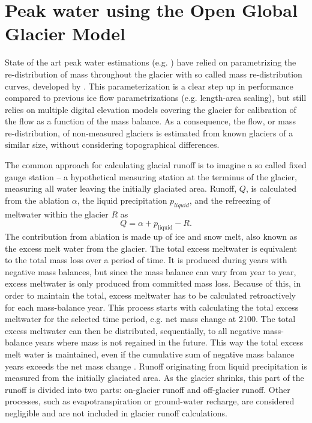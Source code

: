 \documentclass[12pt, a4paper]{article}
\begin{document}
\section{Peak water using the Open Global Glacier Model}
State of the art peak water estimations (e.g.
\cite{rounceGlacierMassChange2020,hussGlobalscaleHydrologicalResponse2018}) have
relied on parametrizing the re-distribution of mass throughout the glacier with
so called mass re-distribution curves, developed by
\textcite{hussFutureHighmountainHydrology2010}. This parameterization is a clear
step up in performance compared to previous ice flow parametrizations (e.g.
length-area scaling), but still relies on multiple digital elevation models
covering the glacier for calibration of the flow as a function of the mass
balance. As a consequence, the flow, or mass re-distribution, of non-measured
glaciers is estimated from known glaciers of a similar size, without
considering topographical differences. 

The common approach for calculating glacial runoff is to imagine a so called
fixed gauge station -- a hypothetical measuring station at the terminus of the
glacier, measuring all water leaving the initially glaciated area. Runoff, $Q$,
is calculated from the ablation $\alpha$, the liquid precipitation $p_{liquid}$,
and the refreezing of meltwater within the glacier $R$ as
\begin{equation}
    Q = \alpha + p_{\mathrm{liquid}} - R.
\end{equation}
The contribution from ablation is made up of ice and snow melt, also known as
the excess melt water from the glacier. The total excess meltwater is equivalent
to the total mass loss over a period of time. It is produced during years with
negative mass balances, but since the mass balance can vary from year to year,
excess meltwater is only produced from committed mass loss. Because of this, in
order to maintain the total, excess meltwater has to be calculated retroactively
for each mass-balance year. This process starts with calculating the total
excess meltwater for the selected time period, e.g. net mass change at 2100. The
total excess meltwater can then be distributed, sequentially, to all negative
mass-balance years where mass is not regained in the future. This way the total
excess melt water is maintained, even if the cumulative sum of negative mass
balance years exceeds the net mass change
\parencite{rounceGlacierMassChange2020}. Runoff originating from liquid
precipitation is measured from the initially glaciated area. As the glacier
shrinks, this part of the runoff is divided into two parts: on-glacier runoff
and off-glacier runoff. Other processes, such as evapotranspiration or
ground-water recharge, are considered negligible and are not included in glacier
runoff calculations.
\end{document}
